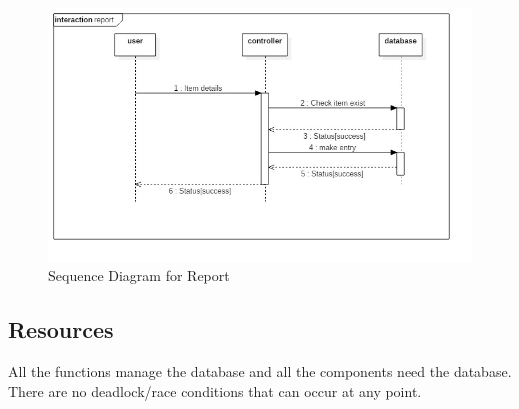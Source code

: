 \documentclass[a4paper,12pt]{article}
\begin{document}
\begin{figure}[h!]
  \includegraphics[width=1\textwidth]{report}
  \caption{Sequence Diagram for Report}
\end{figure}
\subsection{Resources}
All the functions manage the database and all the components need the database. There are no deadlock/race conditions that can occur at any point.
\end{document}
